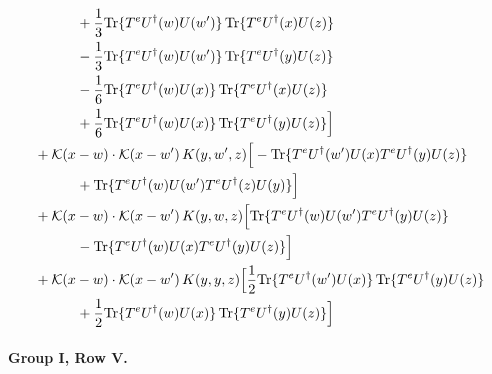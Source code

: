 \documentclass[10pt]{article}
\numberwithin{equation}{section}
\begin{document}
\begin{align}
&\quad\quad\quad+\frac{1}{3}{\rm Tr}\{T^eU^\dagger(w)U(w')\}\,{\rm Tr}\{T^eU^\dagger(x)U(z)\}\notag\\
&\quad\quad\quad-\frac{1}{3}{\rm Tr}\{T^eU^\dagger(w)U(w')\}\,{\rm Tr}\{T^eU^\dagger(y)U(z)\}\notag\\
&\quad\quad\quad-\frac{1}{6}{\rm Tr}\{T^eU^\dagger(w)U(x)\}\,{\rm Tr}\{T^eU^\dagger(x)U(z)\}\notag\\
&\quad\quad\quad+\frac{1}{6}{\rm Tr}\{T^eU^\dagger(w)U(x)\}\,{\rm Tr}\{T^eU^\dagger(y)U(z)\}\Big]\notag\\
&+\mathcal K(x-w)\cdot\mathcal K(x-w')\,K(y,w',z)\Big[-{\rm Tr}\{T^eU^\dagger(w')U(x)T^eU^\dagger(y)U(z)\}\notag\\
&\quad\quad\quad+{\rm Tr}\{T^eU^\dagger(w)U(w')T^eU^\dagger(z)U(y)\}\Big]\notag\\
&+\mathcal K(x-w)\cdot\mathcal K(x-w')\,K(y,w,z)\Big[{\rm Tr}\{T^eU^\dagger(w)U(w')T^eU^\dagger(y)U(z)\}\notag\\
&\quad\quad\quad-{\rm Tr}\{T^eU^\dagger(w)U(x)T^eU^\dagger(y)U(z)\}\Big]\notag\\
&+\mathcal K(x-w)\cdot\mathcal K(x-w')\,K(y,y,z)\Big[\frac{1}{2}{\rm Tr}\{T^eU^\dagger(w')U(x)\}\,{\rm Tr}\{T^eU^\dagger(y)U(z)\}\notag\\
&\quad\quad\quad+\frac{1}{2}{\rm Tr}\{T^eU^\dagger(w)U(x)\}\,{\rm Tr}\{T^eU^\dagger(y)U(z)\}\Big]
\label{eq:G1IV}
\end{align}

\paragraph{Group I, Row V.}
\end{document}
